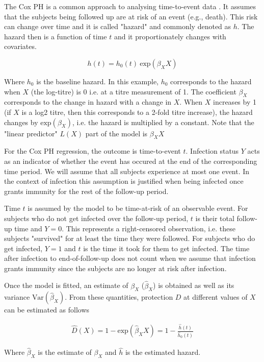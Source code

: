 The Cox PH is a common approach to analysing time-to-event data \cite{George;2014}. It assumes that the subjects being followed up are at risk of an event (e.g., death). This risk can change over time and it is called "hazard" and commonly denoted as $h$. The hazard then is a function of time $t$ and it proportionately changes with covariates.

$$
    h(t) = h_0(t) \ \text{exp}(\beta_XX)
$$

Where $h_0$ is the baseline hazard. In this example, $h_0$ corresponds to the hazard when $X$ (the log-titre) is 0 i.e. at a titre measurement of 1. The coefficient $\beta_X$ corresponds to the change in hazard with a change in $X$. When $X$ increases by 1 (if $X$ is a log2 titre, then this corresponds to a 2-fold titre increase), the hazard changes by $\text{exp}(\beta_X)$, i.e. the hazard is multiplied by a constant. Note that the "linear predictor" $L(X)$ part of the model is $\beta_XX$

For the Cox PH regression, the outcome is time-to-event $t$. Infection status $Y$ acts as an indicator of whether the event has occured at the end of the corresponding time period. We will assume that all subjects experience at most one event. In the context of infection this assumption is justified when being infected once grants immunity for the rest of the follow-up period.

Time $t$ is assumed by the model to be time-at-risk of an observable event. For subjects who do not get infected over the follow-up period, $t$ is their total follow-up time and $Y=0$. This represents a right-censored observation, i.e. these subjects "survived" for at least the time they were followed. For subjects who do get infected, $Y=1$ and $t$ is the time it took for them to get infected. The time after infection to end-of-follow-up does not count when we assume that infection grants immunity since the subjects are no longer at risk after infection.

Once the model is fitted, an estimate of $\beta_X$ ($\hat{\beta}_X$) is obtained as well as its variance $\text{Var}(\hat{\beta}_X)$. From these quantities, protection $D$ at different values of $X$ can be estimated as follows

\begin{gather}
    \hat{D}(X) = 1 - \text{exp}(\hat{\beta}_X X) = 1 - \frac{\hat{h}(t)}{\hat{h}_0(t)}
    \label{eq:cox-prot}
\end{gather}

Where $\hat{\beta}_X$ is the estimate of $\beta_X$ and $\hat{h}$ is the estimated hazard.

